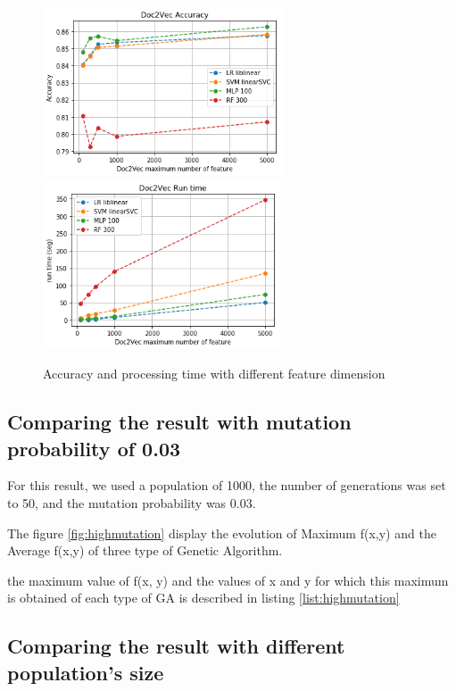 \documentclass[oneside,onecolumn]{article}
\begin{document}
\begin{figure}[H]
	\includegraphics[height=5cm]{report_plot/plot_variable_dimension_desktop/doc2vec_accurary_dimension.png}
	\includegraphics[height=5cm]{report_plot/plot_variable_dimension_desktop/doc2vec_accurary_runtime.png}
	

	
	
	\caption{Accuracy and processing time with different feature dimension} 
	\label{fig:lowmutation}
\end{figure}


\subsection{Comparing the result with mutation probability of 0.03}


For this result, we used a population of 1000, the number of generations was set to 50, and the mutation probability was 0.03.

The figure \ref{fig:highmutation} display the evolution of  Maximum f(x,y) and the Average f(x,y) of three type of Genetic Algorithm.

the maximum value of f(x, y) and the values of x and y for which this maximum is obtained of each type of GA is described in listing \ref{list:highmutation}






\subsection{Comparing the result with different population's size}
\end{document}
